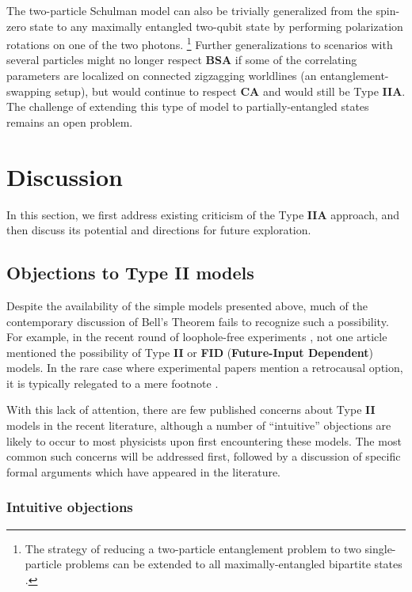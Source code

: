 \documentclass[onecolumn, nofootinbib, 12pt]{revtex4-1}
\begin{document}
The two-particle Schulman model can also be trivially generalized from the spin-zero state to any maximally entangled two-qubit state by performing polarization rotations on one of the two photons.%
\footnote{The strategy of reducing a two-particle entanglement problem to two single-particle problems can be extended to all maximally-entangled bipartite states \cite{wharton2011}.}
Further generalizations to scenarios with several particles \cite{bennett1993,pan1998} might no longer respect {\bf BSA} if some of the correlating parameters are localized on connected zigzagging worldlines (an entanglement-swapping setup), but would continue to respect {\bf CA} and would still be Type {\bf IIA}.  The challenge of extending this type of model to partially-entangled states remains an open problem.  


\section{Discussion}
\label{sec:proscons}

In this section, we first address existing criticism of the Type {\bf IIA} approach, and then discuss its potential and directions for future exploration.

\subsection{Objections to Type {\bf II} models}
\label{sec:con_arguments}

Despite the availability of the simple models presented above, much of the contemporary discussion of Bell's Theorem fails to recognize such a possibility.  For example, in the recent round of loophole-free experiments \cite{hensen2015,giustina2015,shalm2015,rosenfeld2017}, not one article mentioned the possibility of Type {\bf II} or {\bf FID} ({\bf Future-Input Dependent}) models.  In the rare case where experimental papers mention a retrocausal option, it is typically relegated to a mere footnote \cite{handsteiner2017,rauch2018}.

With this lack of attention, there are few published concerns about Type {\bf II} models in the recent literature, although a number of ``intuitive'' objections are likely to occur to most physicists upon first encountering these models.  The most common such concerns will be addressed first, followed by a discussion of specific formal arguments which have appeared in the literature.  

\subsubsection{Intuitive objections}
\end{document}
